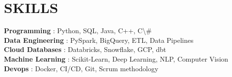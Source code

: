 \documentclass[letterpaper,11pt]{article}
\begin{document}
\section{SKILLS}
\begin{itemize}[leftmargin=0in, label={}]
\small{\item{
     \textbf{Programming} {: Python, SQL, Java, C++, C\textbackslash{}#}\vspace{2pt} \\
     \textbf{Data Engineering} {: PySpark, BigQuery, ETL, Data Pipelines}\vspace{2pt} \\
     \textbf{Cloud Databases} {: Databricks, Snowflake, GCP, dbt}\vspace{2pt} \\
     \textbf{Machine Learning} {: Scikit-Learn, Deep Learning, NLP, Computer Vision}\vspace{2pt} \\
     \textbf{Devops} {: Docker, CI/CD, Git, Scrum methodology}
}}
\end{itemize}
\end{document}
